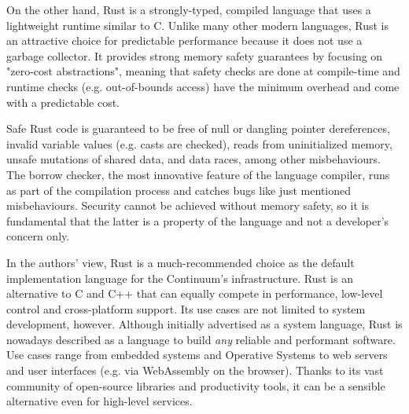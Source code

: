 
On the other hand, Rust is a strongly-typed, compiled language that uses a lightweight runtime similar to C. Unlike many other modern languages, Rust is an attractive choice for predictable performance because it does not use a garbage collector. It provides strong memory safety guarantees by focusing on "zero-cost abstractions", meaning that safety checks are done at compile-time and runtime checks (e.g. out-of-bounds access) have the minimum overhead and come with a predictable cost.


Safe Rust code is guaranteed to be free of null or dangling pointer dereferences, invalid variable values (e.g. casts are checked), reads from uninitialized memory, unsafe mutations of shared data, and data races, among other misbehaviours.  The borrow checker, the most innovative feature of the language compiler, runs as part of the compilation process and catches bugs like just mentioned misbehaviours. Security cannot be achieved without memory safety, so it is fundamental that the latter is a property of the language and not a developer's concern only.

In the authors' view, Rust is a much-recommended choice as the default implementation language for the Continuum's infrastructure. Rust is an alternative to C and C++ that can equally compete in performance, low-level control and cross-platform support. Its use cases are not limited to system development, however. Although initially advertised as a system language, Rust is nowadays described as a language to build \emph{any} reliable and performant software. Use cases range from embedded systems and Operative Systems to web servers and user interfaces (e.g. via WebAssembly on the browser). Thanks to its vast community of open-source libraries and productivity tools, it can be a sensible alternative even for high-level services.

